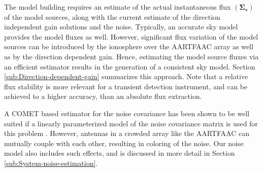 \documentclass{aa}
\begin{document}
The  model  building requires  an  estimate  of  the actual  instantaneous  flux
$\left(\mathbf{\Sigma_{s}}\right)$ of the model  sources, along with the current
estimate of the  direction independent gain solutions and  the noise. Typically,
an accurate sky  model provides the model fluxes  as well.  However, significant
flux variation of the model sources can be introduced by the ionosphere over the
AARTFAAC array  as well as by  the direction dependent  gain.  Hence, estimating
the model source fluxes via an  efficient estimator results in the generation of
a consistent  sky model.  Section  \ref{sub:Direction-dependent-gain} summarizes
this  approach.  Note  that a  relative flux  stability is  more relevant  for a
transient detection instrument, and can be achieved to a higher accuracy, than an
absolute flux extraction.  

A  COMET based estimator  for the  noise covariance  has been  shown to  be well
suited if a linearly parameterized model  of the noise covariance matrix is used
for this problem \citep{ottersten1998covariance}.  However, antennas in a crowded
array  like the  AARTFAAC  can mutually  couple  with each  other, resulting  in
coloring  of the  noise. Our  noise  model also  includes such  effects, and  is
discussed in more detail in Section \ref{sub:System-noise-estimation}.

\end{document}
